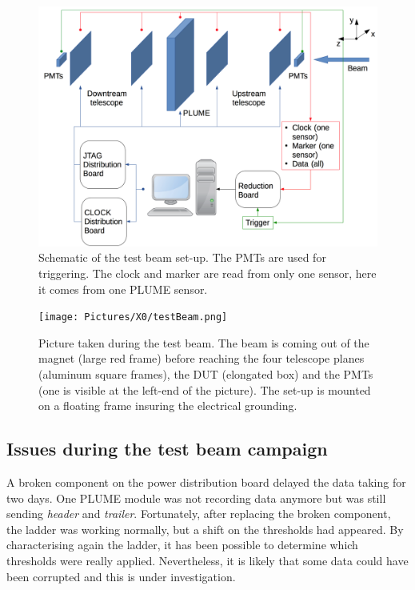     \begin{figure}[!tbh]
      \centering
      \includegraphics[width = \textwidth]{Pictures/X0/testBeamAcquisition.png}
      \caption{Schematic of the test beam set-up. The PMTs are used for triggering. The clock and marker are read from only one sensor, here it comes from one PLUME sensor.}
      \label{fig:testBeamAcq}
    \end{figure}

    \begin{figure}[!tbh]
      \centering
      \texttt{[image: Pictures/X0/testBeam.png]}
      \caption{Picture taken during the test beam. The beam is coming out of the magnet (large red frame) before reaching the four telescope planes (aluminum square frames), the DUT (elongated box) and the PMTs (one is visible at the left-end of the picture). The set-up is mounted on a floating frame insuring the electrical grounding.}
      \label{fig:testBeam}
    \end{figure}

    \subsection{Issues during the test beam campaign}

    A broken component on the power distribution board delayed the data taking for two days.
    One \gls{PLUME} module was not recording data anymore but was still sending \textit{header} and \textit{trailer}.
    Fortunately, after replacing the broken component, the ladder was working normally, but a shift on the thresholds had appeared.
    By characterising again the ladder, it has been possible to determine which thresholds were really applied. 
    Nevertheless, it is likely that some data could have been corrupted and this is under investigation.
   
